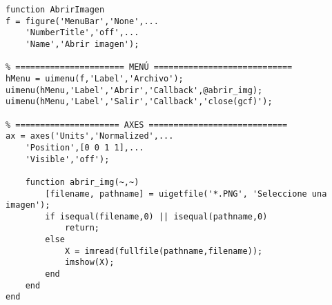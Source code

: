\sol

\begin{verbatim}
function AbrirImagen
f = figure('MenuBar','None',...
    'NumberTitle','off',...
    'Name','Abrir imagen');

% ====================== MENÚ ============================
hMenu = uimenu(f,'Label','Archivo');
uimenu(hMenu,'Label','Abrir','Callback',@abrir_img);
uimenu(hMenu,'Label','Salir','Callback','close(gcf)');

% ===================== AXES ============================
ax = axes('Units','Normalized',...
    'Position',[0 0 1 1],...
    'Visible','off');

    function abrir_img(~,~)
        [filename, pathname] = uigetfile('*.PNG', 'Seleccione una imagen');
        if isequal(filename,0) || isequal(pathname,0)
            return;
        else
            X = imread(fullfile(pathname,filename));
            imshow(X);
        end
    end
end
\end{verbatim}
